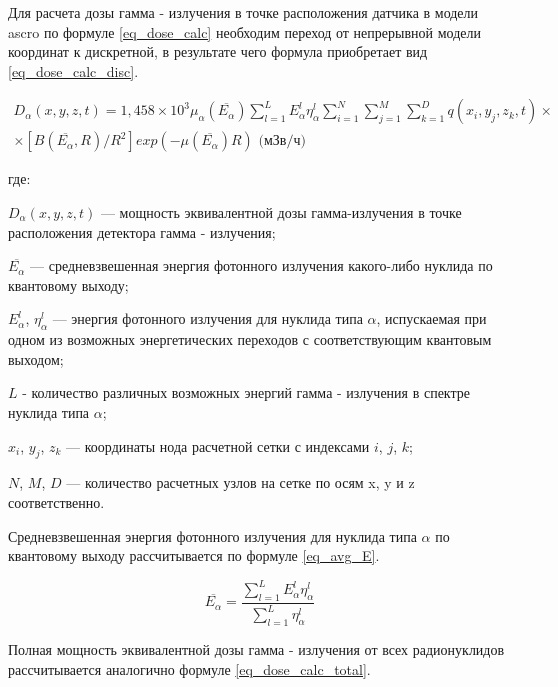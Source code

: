 Для расчета дозы гамма - излучения в точке расположения датчика в модели \ac{ascro} по формуле \ref{eq_dose_calc} 
необходим переход от непрерывной модели координат к дискретной, в результате чего формула приобретает вид 
\ref{eq_dose_calc_disc}. 

\begin{equation}
    \begin{aligned}
        \label{eq_dose_calc_disc}
        D_{\alpha}(x, y, z, t) = 1,458 \times 10^{3} \mu_{\alpha}(\overline{E_{\alpha}}) \sum_{l=1}^{L}{E_{\alpha}^{l} 
            \eta_{\alpha}^{l}} \sum_{i=1}^{N} \sum_{j=1}^{M} \sum_{k=1}^{D} q(x_i, y_j, z_k, t) \times \\ \times 
            [B(\overline{E_{\alpha}}, R) / R^{2}] exp(-\mu(\overline{E_{\alpha}})R) \text{ (мЗв/ч)}
    \end{aligned}
\end{equation}

где:
\begin{description}
    \item $D_{\alpha}(x, y, z, t)$ --- мощность эквивалентной дозы гамма-излучения в точке расположения детектора 
        гамма - излучения;
    \item $\overline{E_{\alpha}}$ --- средневзвешенная энергия фотонного излучения какого-либо нуклида по квантовому 
        выходу;
    \item $E_{\alpha}^{l}$, $\eta_{\alpha}^{l}$ --- энергия фотонного излучения для нуклида типа $\alpha$, испускаемая 
        при одном из возможных энергетических переходов с соответствующим квантовым выходом;
    \item $L$ - количество различных возможных энергий гамма - излучения в спектре нуклида типа $\alpha$;
    \item $x_i$, $y_j$, $z_k$ --- координаты нода расчетной сетки с индексами $i$, $j$, $k$;
    \item $N$, $M$, $D$ --- количество расчетных узлов на сетке по осям x, y и z соответственно.
\end{description}

Средневзвешенная энергия фотонного излучения для нуклида типа $\alpha$ по квантовому выходу рассчитывается по формуле 
\ref{eq_avg_E}.

 \begin{equation}
        \label{eq_avg_E}
        \overline{E_{\alpha}} = \frac{\sum_{l=1}^{L}{E_{\alpha}^{l}}\eta_{\alpha}^{l}}{\sum_{l=1}^{L}{\eta_{\alpha}^{l}}}
\end{equation}

Полная мощность эквивалентной дозы гамма - излучения от всех радионуклидов рассчитывается аналогично формуле 
\ref{eq_dose_calc_total}.